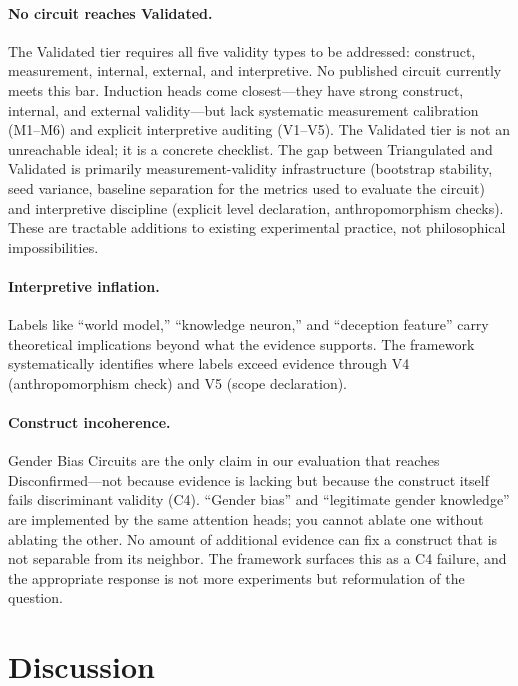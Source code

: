 \documentclass{article}
\begin{document}
\paragraph{No circuit reaches Validated.} The Validated tier requires all five validity types to be addressed: construct, measurement, internal, external, and interpretive. No published circuit currently meets this bar. Induction heads come closest---they have strong construct, internal, and external validity---but lack systematic measurement calibration (M1--M6) and explicit interpretive auditing (V1--V5). The Validated tier is not an unreachable ideal; it is a concrete checklist. The gap between Triangulated and Validated is primarily measurement-validity infrastructure (bootstrap stability, seed variance, baseline separation for the metrics used to evaluate the circuit) and interpretive discipline (explicit level declaration, anthropomorphism checks). These are tractable additions to existing experimental practice, not philosophical impossibilities.

\paragraph{Interpretive inflation.} Labels like ``world model,'' ``knowledge neuron,'' and ``deception feature'' carry theoretical implications beyond what the evidence supports. The framework systematically identifies where labels exceed evidence through V4 (anthropomorphism check) and V5 (scope declaration).

\paragraph{Construct incoherence.} Gender Bias Circuits are the only claim in our evaluation that reaches Disconfirmed---not because evidence is lacking but because the construct itself fails discriminant validity (C4). ``Gender bias'' and ``legitimate gender knowledge'' are implemented by the same attention heads; you cannot ablate one without ablating the other. No amount of additional evidence can fix a construct that is not separable from its neighbor. The framework surfaces this as a C4 failure, and the appropriate response is not more experiments but reformulation of the question.

\section{Discussion}
\label{sec:discussion}
\end{document}
